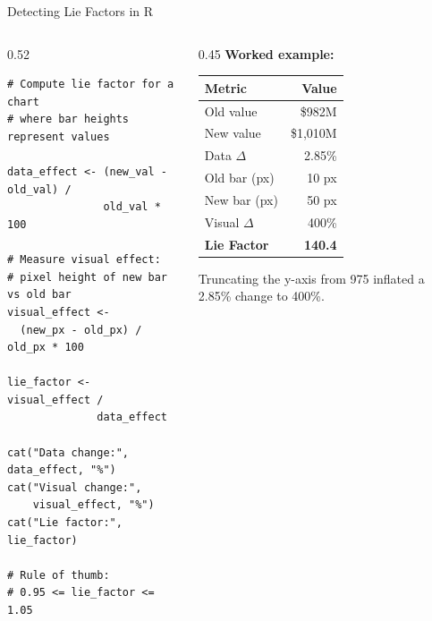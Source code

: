 \documentclass[10pt]{beamer}
\begin{document}
\begin{frame}[fragile]{Detecting Lie Factors in R}
  \begin{columns}[T]
    \begin{column}{0.52\textwidth}
\begin{lstlisting}[style=rstyle]
# Compute lie factor for a chart
# where bar heights represent values

data_effect <- (new_val - old_val) /
               old_val * 100

# Measure visual effect:
# pixel height of new bar vs old bar
visual_effect <-
  (new_px - old_px) / old_px * 100

lie_factor <- visual_effect /
              data_effect

cat("Data change:", data_effect, "%")
cat("Visual change:",
    visual_effect, "%")
cat("Lie factor:", lie_factor)

# Rule of thumb:
# 0.95 <= lie_factor <= 1.05
\end{lstlisting}
    \end{column}
    \begin{column}{0.45\textwidth}
      \textbf{Worked example:}

      \begin{tabular}{lr}
        \toprule
        Metric & Value \\
        \midrule
        Old value    & \$982M \\
        New value    & \$1,010M \\
        Data $\Delta$    & 2.85\% \\
        \midrule
        Old bar (px) & 10 px \\
        New bar (px) & 50 px \\
        Visual $\Delta$  & 400\% \\
        \midrule
        \textbf{Lie Factor} & \textbf{140.4} \\
        \bottomrule
      \end{tabular}

      \vspace{6pt}
      {\small Truncating the y-axis from 975
      inflated a 2.85\% change to 400\%.}
    \end{column}
  \end{columns}
\end{frame}
\end{document}
